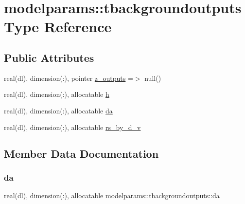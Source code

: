 \hypertarget{structmodelparams_1_1tbackgroundoutputs}{}\section{modelparams\+:\+:tbackgroundoutputs Type Reference}
\label{structmodelparams_1_1tbackgroundoutputs}
\subsection*{Public Attributes}
\begin{DoxyCompactItemize}
\item 
real(dl), dimension(\+:), pointer \mbox{\hyperlink{structmodelparams_1_1tbackgroundoutputs_a4dfea44e1d4637c0a0ee1843bd9078cf}{z\+\_\+outputs}} =$>$ null()
\item 
real(dl), dimension(\+:), allocatable \mbox{\hyperlink{structmodelparams_1_1tbackgroundoutputs_a3e74622af90cde3980e1511daf3d4eb7}{h}}
\item 
real(dl), dimension(\+:), allocatable \mbox{\hyperlink{structmodelparams_1_1tbackgroundoutputs_a3e045eb1b9a1042dd488a6c69a8096c0}{da}}
\item 
real(dl), dimension(\+:), allocatable \mbox{\hyperlink{structmodelparams_1_1tbackgroundoutputs_a90b2aca37fdfed20bdb4168d269efb51}{rs\+\_\+by\+\_\+d\+\_\+v}}
\end{DoxyCompactItemize}


\subsection{Member Data Documentation}
\mbox{\label{structmodelparams_1_1tbackgroundoutputs_a3e045eb1b9a1042dd488a6c69a8096c0}} 
\subsubsection{\texorpdfstring{da}{da}}
{\footnotesize\ttfamily real(dl), dimension(\+:), allocatable modelparams\+::tbackgroundoutputs\+::da}

\mbox{\label{structmodelparams_1_1tbackgroundoutputs_a3e74622af90cde3980e1511daf3d4eb7}} 
